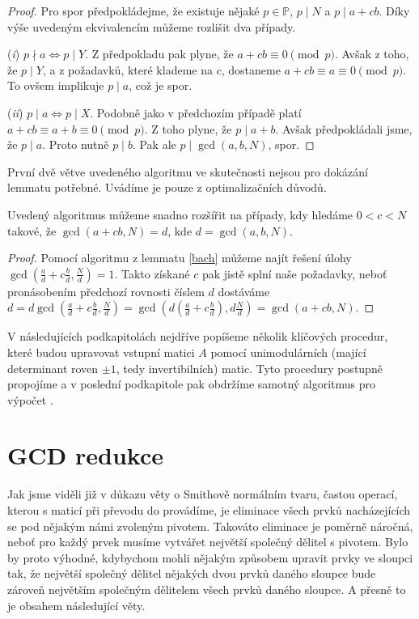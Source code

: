 \begin{proof}
Pro spor předpokládejme, že existuje nějaké $ p \in \mathbb{P}$,
$ p \mid N $ a $ p \mid a + cb $.
Díky výše uvedeným ekvivalencím můžeme rozlišit dva případy.

(\textit{i}) $ p \nmid a \Leftrightarrow p \mid Y $.
Z předpokladu pak plyne, že $ a + cb \equiv 0 \pmod{p} $. Avšak z toho, že
$ p \mid Y $, a z požadavků, které klademe na $ c $, dostaneme
$ a + cb \equiv a \equiv 0 \pmod{p} $. To ovšem implikuje $ p \mid a $, což
je spor.

(\textit{ii}) $ p \mid a \Leftrightarrow p \mid X $.
Podobně jako v předchozím případě platí $ a + cb \equiv a + b \equiv 0 \pmod{p} $.
Z toho plyne, že $ p \mid a + b $. Avšak předpokládali jsme, že $ p \mid a $.
Proto nutně $ p \mid b $. Pak ale $ p \mid \gcd(a,b,N) $, spor.

\end{proof}
\begin{pozn}
První dvě větve uvedeného algoritmu ve skutečnosti nejsou pro dokázání lemmatu
potřebné. Uvádíme je pouze z optimalizačních důvodů.
\end{pozn}
\begin{dus}\label{Bach_Dus}
Uvedený algoritmus můžeme snadno rozšířit na případy, kdy hledáme $ 0 < c < N $
takové, že $ \gcd(a + cb,N) = d $, kde $ d = \gcd(a,b,N) $.
\end{dus}
\begin{proof}
Pomocí algoritmu z lemmatu \ref{bach} můžeme najít řešení úlohy
$ \gcd(\frac{a}{d} + c\frac{b}{d},\frac{N}{d}) = 1 $. Takto získané $ c $ pak
jistě splní naše požadavky, neboť pronásobením předchozí rovnosti číslem $ d $
dostáváme $ d = d \gcd(\frac{a}{d} + c\frac{b}{d},\frac{N}{d}) =
\gcd(d(\frac{a}{d} + c\frac{b}{d}),d\frac{N}{d}) = \gcd(a + cb,N) $.
\end{proof}

V následujících podkapitolách nejdříve popíšeme několik klíčových procedur, které
budou upravovat vstupní matici $ A $ pomocí unimodulárních (mající determinant
roven $\pm 1$, tedy invertibilních) matic.
Tyto procedury postupně propojíme a v poslední podkapitole pak obdržíme samotný
algoritmus pro výpočet \rst{}.





\section{GCD redukce}
Jak jsme viděli již v důkazu věty o Smithově normálním tvaru, častou operací,
kterou s maticí při převodu do \snf{} provádíme, je eliminace všech prvků
nacházejících se pod nějakým námi zvoleným pivotem. Takováto eliminace je poměrně
náročná, neboť pro každý prvek musíme vytvářet největší společný dělitel s pivotem.
Bylo by proto výhodné, kdybychom mohli nějakým způsobem upravit prvky ve sloupci tak,
že největší společný dělitel nějakých dvou prvků daného sloupce bude zároveň největším
společným dělitelem všech prvků daného sloupce. A přesně to je obsahem následující věty.

